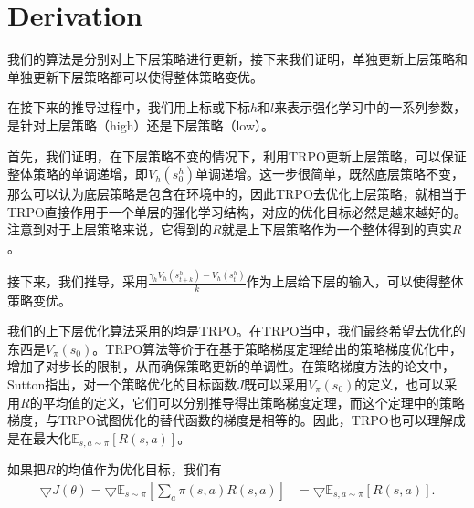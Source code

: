 \documentclass[degree=bachelor, tocarialchapter, pifootnote]{thuthesis}
\begin{document}

%

%


\mainmatter
%
%

\section{Derivation}
我们的算法是分别对上下层策略进行更新，接下来我们证明，单独更新上层策略和单独更新下层策略都可以使得整体策略变优。

在接下来的推导过程中，我们用上标或下标$h$和$l$来表示强化学习中的一系列参数，是针对上层策略（high）还是下层策略（low）。

首先，我们证明，在下层策略不变的情况下，利用TRPO更新上层策略，可以保证整体策略的单调递增，即$V_h(s_0^h)$单调递增。这一步很简单，既然底层策略不变，那么可以认为底层策略是包含在环境中的，因此TRPO去优化上层策略，就相当于TRPO直接作用于一个单层的强化学习结构，对应的优化目标必然是越来越好的。注意到对于上层策略来说，它得到的$R$就是上下层策略作为一个整体得到的真实$R$。

接下来，我们推导，采用$ \frac{\gamma_h V_h(s_{t + k}^h) - V_h(s_{t}^h)}{k}$作为上层给下层的输入，可以使得整体策略变优。

我们的上下层优化算法采用的均是TRPO\cite{TRPO}。在TRPO当中，我们最终希望去优化的东西是$V_{\pi}(s_0)$。TRPO算法等价于在基于策略梯度定理给出的策略梯度优化中，增加了对步长的限制，从而确保策略更新的单调性。在策略梯度方法的论文\cite{policy_gradient_theorem}中，Sutton指出，对一个策略优化的目标函数$J$既可以采用$V_{\pi}(s_0)$的定义，也可以采用$R$的平均值的定义，它们可以分别推导得出策略梯度定理，而这个定理中的策略梯度，与TRPO试图优化的替代函数的梯度是相等的。因此，TRPO也可以理解成是在最大化$\mathbb{E}_{s, a \sim \pi}[R(s, a)]$。

如果把$R$的均值作为优化目标，我们有
\begin{align}
  \bigtriangledown J(\theta) = \bigtriangledown \mathbb{E}_{s\sim\pi}[\sum_{a} \pi(s, a) R(s, a)]
  &= \bigtriangledown \mathbb{E}_{s, a\sim\pi}[R(s, a)].
  \label{eq:policy_gradient}
\end{align}
\end{document}
